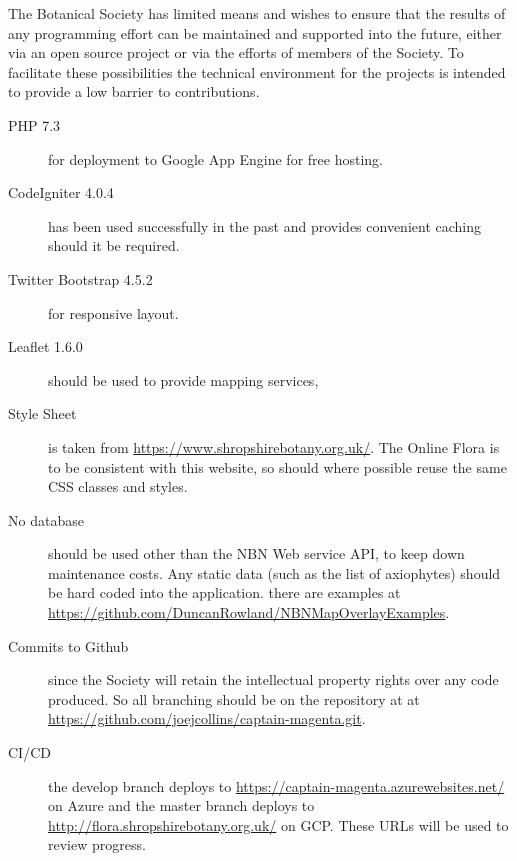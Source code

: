 \documentclass[a4paper,12pt,landscape]{article}
\begin{document}
The Botanical Society has limited means
and wishes to ensure that the results of any programming effort
can be maintained and supported
into the future,
either via an open source project or via the efforts of members of the Society.
To facilitate these possibilities
the technical environment for the projects is intended 
to provide a low barrier to contributions.

\begin{description}
    \item[PHP 7.3] for deployment to Google App Engine for free hosting.
    \item[CodeIgniter 4.0.4] has been used successfully in the past and provides convenient caching should it be required.
    \item[Twitter Bootstrap 4.5.2] for responsive layout.
    \item[Leaflet 1.6.0] should be used to provide mapping services,
    \item[Style Sheet] is taken from \url{https://www.shropshirebotany.org.uk/}.
      The Online Flora is to be consistent with this website,
      so should where possible reuse the same CSS classes and styles.
    \item[No database] should be used other than the NBN Web service API,
      to keep down maintenance costs.
      Any static data 
      (such as the list of axiophytes)
      should be hard coded into the application.
      there are examples at \url{https://github.com/DuncanRowland/NBNMapOverlayExamples}.
    \item[Commits to Github] since the Society will retain the intellectual property rights
      over any code produced.
      So all branching should be on the repository at
      at \url{https://github.com/joejcollins/captain-magenta.git}.
    \item[CI/CD] the develop branch deploys to \url{https://captain-magenta.azurewebsites.net/} on Azure
      and the master branch deploys to \url{http://flora.shropshirebotany.org.uk/} on GCP.
      These URLs will be used to review progress.
\end{description}
\end{document}
